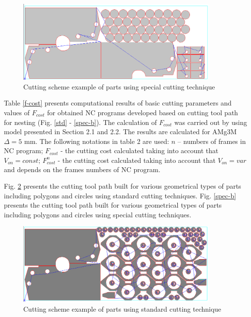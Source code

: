 \documentclass[runningheads]{llncs}
\begin{document}
\begin{figure}
  \begin{center}
  \includegraphics[width=0.9\textwidth]{special.png}
  \caption{Cutting scheme example of parts using special cutting technique}
  \label{special}
  \end{center}
\end{figure}

Table \ref{f-cost} presents computational results of basic cutting parameters and values of $F_{cost}$
for obtained NC programs developed based on cutting tool path for nesting
(Fig. \ref{std} - \ref{spec-b}).
The calculation of $F_{cost}$
was carried out by using model presented in Section 2.1 and 2.2.
The results are calculated for AMg3M $\Delta = 5$ mm.
The following notations in table 2 are used:
$n$ – numbers of frames in NC program;
$F_{cost}$ - the cutting cost calculated taking into account that $V_{on}=const$;
$F^n_{cost}$ - the cutting cost calculated taking into account that $V_{on}=var$  and depends on the frames numbers of NC program.

Fig. \ref{spec-a}
presents the cutting tool path built for various geometrical types of parts
including polygons and circles using standard cutting techniques.
Fig. \ref{spec-b} presents the cutting tool path built for various geometrical types of parts
including polygons and circles using special cutting techniques.

\begin{figure}
  \begin{center}
  \includegraphics[width=0.9\textwidth]{spec-a.png}
  \caption{Cutting scheme example of parts using standard cutting technique}
  \label{spec-a}
  \end{center}
\end{figure}
\end{document}
